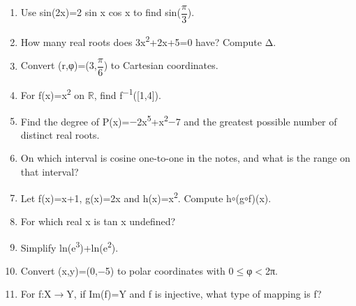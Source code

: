\documentclass[11pt]{article}
\begin{document}
\begin{keepsection}
\begin{enumerate}
\item Use sin(2x)=2 sin x cos x to find sin({\small\ensuremath{\dfrac{π}{3}}}).
\item How many real roots does 3x\textsuperscript{2}+2x+5=0 have? Compute Δ.
\item Convert (r,φ)=(3,{\small\ensuremath{\dfrac{π}{6}}}) to Cartesian coordinates.
\item For f(x)=x\textsuperscript{2} on \ensuremath{\mathbb{R}}, find f\textsuperscript{\ensuremath{-}1}([1,4]).
\item Find the degree of P(x)=\ensuremath{-}2x\textsuperscript{5}+x\textsuperscript{2}\ensuremath{-}7 and the greatest possible number of distinct real roots.
\item On which interval is cosine one-to-one in the notes, and what is the range on that interval?
\item Let f(x)=x+1, g(x)=2x and h(x)=x\textsuperscript{2}. Compute h\ensuremath{\circ}(g\ensuremath{\circ}f)(x).
\item For which real x is tan x undefined?
\item Simplify ln(e\textsuperscript{3})+ln(e\textsuperscript{2}).
\item Convert (x,y)=(0,\ensuremath{-}5) to polar coordinates with 0\ensuremath{\leq}φ\ensuremath{<}2π.
\item For f:X\ensuremath{\to}Y, if Im(f)=Y and f is injective, what type of mapping is f?
\end{enumerate}

\end{keepsection}
\end{document}
